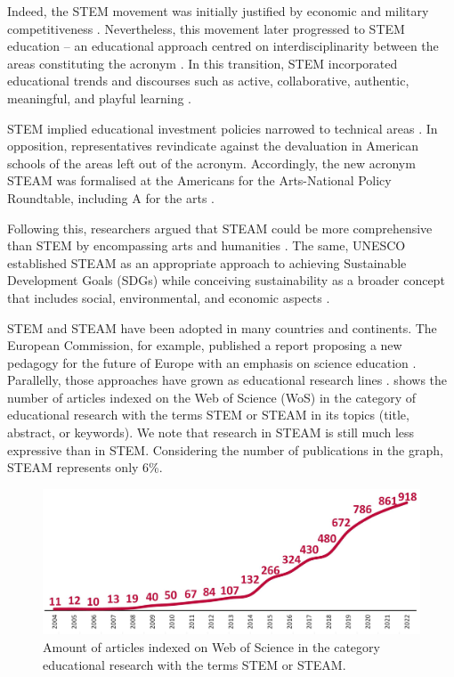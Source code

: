 \documentclass[english]{textolivre}
\begin{document}
Indeed, the STEM movement was initially justified by economic and military competitiveness \cite{chesky_introduction_2015}. Nevertheless, this movement later progressed to STEM education – an educational approach centred on interdisciplinarity between the areas constituting the acronym \cite{kelley_conceptual_2016}. In this transition, STEM incorporated educational trends and discourses such as active, collaborative, authentic, meaningful, and playful learning \cite{michael_wheres_2006, zosh_accessing_2018}. 

STEM implied educational investment policies narrowed to technical areas \cite{reynolds2009increasing, stephenson_increasing_2022}. In opposition, representatives revindicate against the devaluation in American schools of the areas left out of the acronym. Accordingly, the new acronym STEAM was formalised at the Americans for the Arts-National Policy Roundtable, including A for the arts \cite{perignat_steam_2019}.

Following this, researchers argued that STEAM could be more comprehensive than STEM by encompassing arts and humanities \cite{guyotte_toward_2020}. The same, UNESCO established STEAM as an appropriate approach to achieving Sustainable Development Goals (SDGs) \cite{united2018} while conceiving sustainability as a broader concept that includes social, environmental, and economic aspects \cite{brundtland1987}.

STEM and STEAM have been adopted in many countries and continents. The European Commission, for example, published a report proposing a new pedagogy for the future of Europe with an emphasis on science education \cite{rocarb2007}. Parallelly, those approaches have grown as educational research lines \cite{marin-marin_steam_2021}.  shows the number of articles indexed on the Web of Science (WoS) in the category of educational research with the terms STEM or STEAM in its topics (title, abstract, or keywords). We note that research in STEAM is still much less expressive than in STEM. Considering the number of publications in the graph, STEAM represents only 6\%.

\begin{figure}[htbp]
\centering
\begin{minipage}{.8\textwidth}
 \includegraphics[width=\textwidth]{imagem2.jpg}
 \caption{Amount of articles indexed on Web of Science in the category educational research with the terms STEM or STEAM.}
 \label{fig2}
\end{minipage}
\end{figure}
\end{document}
